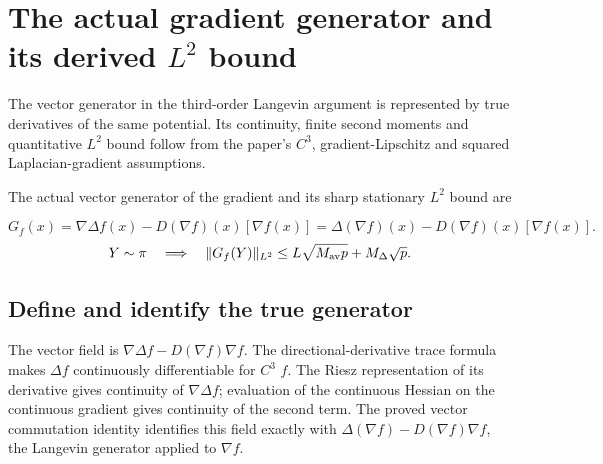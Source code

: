 \documentclass[11pt,a4paper]{report}
\begin{document}
\section{\texorpdfstring{The actual gradient generator and its derived \(L^{2}\) bound}{The actual gradient generator and its derived L² bound}}
\label{proof-module-AverageLMC-LaplacianGenerator-lean}


The vector generator in the third-order Langevin argument is represented by true derivatives of the same potential. Its continuity, finite second moments and quantitative \(L^{2}\) bound follow from the paper’s \(C^{3}\), gradient-Lipschitz and squared Laplacian-gradient assumptions.



The actual vector generator of the gradient and its sharp stationary \(L^2\) bound are


\[G_f(x)=\nabla\Delta f(x)-D(\nabla f)(x)[\nabla f(x)]=\Delta(\nabla f)(x)-D(\nabla f)(x)[\nabla f(x)].\]
\[Y\sim\pi\quad\Longrightarrow\quad\|G_f(Y)\|_{L^2}\le L\sqrt{M_{\rm av}p}+M_\Delta\sqrt p.\]\subsection{\texorpdfstring{Define and identify the true generator}{Define and identify the true generator}}
\label{report-step-AverageLMC-LaplacianGenerator-lean-1}


The vector field is \(\nabla \Delta f-D(\nabla f)\nabla f\). The directional-derivative trace formula makes \(\Delta f\) continuously differentiable for \(C^{3}\) \(f\). The Riesz representation of its derivative gives continuity of \(\nabla \Delta f\); evaluation of the continuous Hessian on the continuous gradient gives continuity of the second term. The proved vector commutation identity identifies this field exactly with \(\Delta (\nabla f)-D(\nabla f)\nabla f\), the Langevin generator applied to \(\nabla f\).
\end{document}
